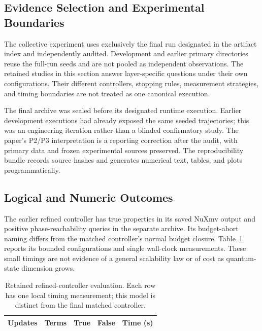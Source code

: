 \documentclass[conference]{IEEEtran}
\begin{document}
\subsection{Evidence Selection and Experimental Boundaries}
The collective experiment uses exclusively the final run designated in the artifact index and independently audited. Development and earlier primary directories reuse the full-run seeds and are not pooled as independent observations. The retained studies in this section answer layer-specific questions under their own configurations. Their different controllers, stopping rules, measurement strategies, and timing boundaries are not treated as one canonical execution.

The final archive was sealed before its designated runtime execution. Earlier development executions had already exposed the same seeded trajectories; this was an engineering iteration rather than a blinded confirmatory study. The paper's P2/P3 interpretation is a reporting correction after the audit, with primary data and frozen experimental sources preserved. The reproducibility bundle records source hashes and generates numerical text, tables, and plots programmatically.

\subsection{Logical and Numeric Outcomes}
The earlier refined controller has \LegacyLogicalProperties true properties in its saved NuXmv output and \PhaseQueries positive phase-reachability queries in the separate archive. Its budget-abort naming differs from the matched controller's normal budget closure. Table~\ref{tab:logical-scaling} reports its bounded configurations and single wall-clock measurements. These small timings are not evidence of a general scalability law or of cost as quantum-state dimension grows.

\begin{table}[!t]
\centering\footnotesize
\caption{Retained refined-controller evaluation. Each row has one local timing measurement; this model is distinct from the final matched controller.}
\label{tab:logical-scaling}
\begin{tabular}{@{}rrrrr@{}}\toprule
Updates & Terms & True & False & Time (s) \\
\midrule


\end{tabular}
\end{table}
\end{document}
